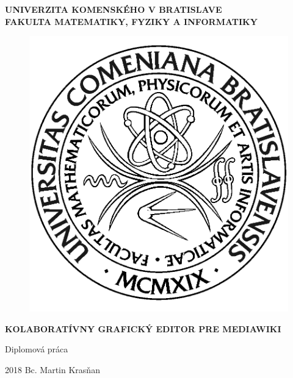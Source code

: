 \documentclass[12pt, a4paper, oneside]{book}
\newcommand\mftitle{Kolaboratívny grafický editor pre MediaWiki}
\newcommand\mfthesistype{Diplomová práca}
\newcommand\mfauthor{Bc. Martin Krasňan}
\newcommand\mfuniversity{UNIVERZITA KOMENSKÉHO V BRATISLAVE}
\newcommand\mffaculty{FAKULTA MATEMATIKY, FYZIKY A INFORMATIKY}
\begin{document}
\frontmatter

\setcounter{secnumdepth}{2}

\thispagestyle{empty}

\noindent
\begin{minipage}{\textwidth}
\begin{center}
\textbf{\mfuniversity \\
\mffaculty}
\end{center}
\end{minipage}

\vfill
\begin{figure}[!hbt]
	\begin{center}
		\includegraphics{images/base/logo_fmph}
		\label{img:logo}
	\end{center}
\end{figure}
\begin{center}
	\begin{minipage}{0.8\textwidth}
		\centerline{\textbf{\Large\MakeUppercase{\mftitle}}}
		\smallskip
		\centerline{\mfthesistype}
	\end{minipage}
\end{center}
\vfill
2018 \hfill
\mfauthor
\eject 

\thispagestyle{empty}
\end{document}
